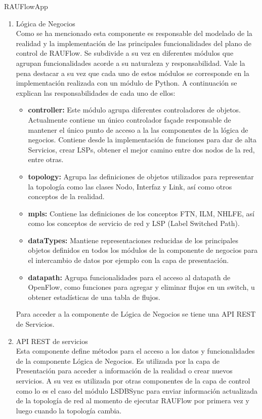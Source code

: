 \begin{subsubsection}{RAUFlowApp}
\begin{enumerate}
\item Lógica de Negocios\\
Como se ha mencionado esta componente es responsable del modelado de la realidad y la implementaci\'on de las principales funcionalidades del plano de control de RAUFlow. Se subdivide a su vez en diferentes m\'odulos que agrupan funcionalidades acorde a su naturaleza y responsabilidad. Vale la pena destacar a su vez que cada uno de estos m\'odulos se corresponde en la implementaci\'on realizada con un m\'odulo de Python. A continuaci\'on se explican las responsabilidades de cada uno de ellos:

\begin{itemize}
\item \textbf{controller:} Este m\'odulo agrupa diferentes controladores de objetos. Actualmente contiene un \'unico controlador façade responsable de mantener el \'unico punto de acceso a la las componentes de la l\'ogica de negocios. Contiene desde la implementaci\'on de funciones para dar de alta Servicios, crear LSPs, obtener el mejor camino entre dos nodos de la red, entre otras.

\item \textbf{topology:} Agrupa las definiciones de objetos utilizados para representar la topolog\'ia como las clases Nodo, Interfaz y Link, así como otros conceptos de la realidad.
 
\item \textbf{mpls:} Contiene las definiciones de los conceptos FTN, ILM, NHLFE, as\'i como los conceptos de servicio de red y LSP (Label Switched Path).

\item \textbf{dataTypes:} Mantiene representaciones reducidas de los principales objetos definidos en todos los m\'odulos de la componente de negocios para el intercambio de datos por ejemplo con la capa de presentaci\'on. 

\item \textbf{datapath:} Agrupa funcionalidades para el acceso al datapath de OpenFlow, como funciones para agregar y eliminar flujos en un switch, u obtener estad\'isticas de una tabla de flujos.
\end{itemize} 

Para acceder a la componente de Lógica de Negocios se tiene una API REST de Servicios.

\item API REST de servicios\\
Esta componente define m\'etodos para el acceso a los datos y funcionalidades de la componente Lógica de Negocios. Es utilizada por la capa de Presentaci\'on para acceder a informaci\'on de la realidad o crear nuevos servicios. A su vez es utilizada por otras componentes de la capa de control como lo es el caso del m\'odulo LSDBSync para enviar informaci\'on actualizada de la topolog\'ia de red al momento de ejecutar RAUFlow por primera vez y luego cuando la topolog\'ia cambia. 


\end{enumerate}
\end{subsubsection}
